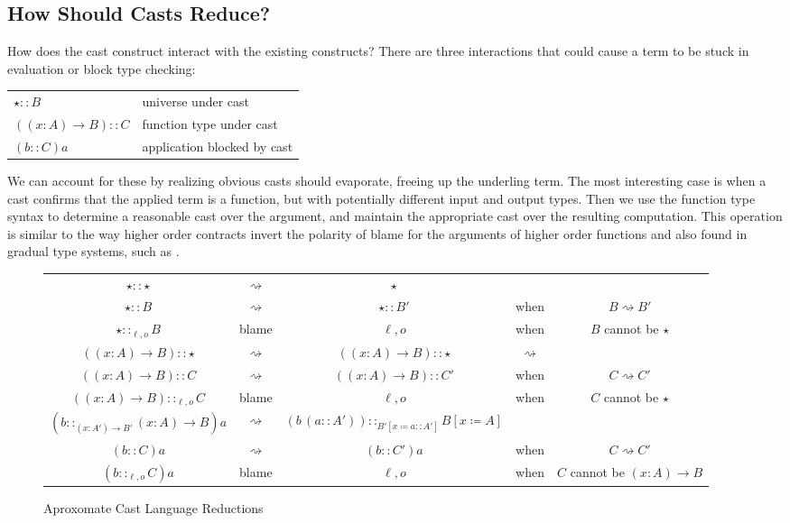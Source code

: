 \subsection{How Should Casts Reduce?}

How does the cast construct interact with the existing constructs?
There are three interactions that could cause a term to be stuck in evaluation or block type checking:

\begin{tabular}{ll}
$\star::B$ & universe under cast\tabularnewline
$\left(\left(x:A\right)\rightarrow B\right)::C$ & function type under cast\tabularnewline
$\left(b::C\right)a$ & application blocked by cast\tabularnewline
\end{tabular}

We can account for these by realizing obvious casts should evaporate, freeing up the underling term.
The most interesting case is when a cast confirms that the applied term is a function, but with potentially different input and output types.
Then we use the function type syntax to determine a reasonable cast over the argument, and maintain the appropriate cast over the resulting computation.
This operation is similar to the way higher order contracts invert the polarity of blame for the arguments of higher order functions \cite{10.1145/581478.581484} and also found in gradual type systems, such as \cite{10.1007/978-3-642-00590-9_1}.

\begin{sidewaysfigure}
\begin{tabular}{ccccc}
$\star::\star$ & $\rightsquigarrow$ & $\star$ &  & \tabularnewline
$\star::B$ & $\rightsquigarrow$ & $\star::B'$ & when  & $B\rightsquigarrow B'$\tabularnewline
$\star::_{\ell,o}B$ & blame & $\ell,o$ & when  & $B$ cannot be $\star$ \tabularnewline
$\left(\left(x:A\right)\rightarrow B\right)::\star$ & $\rightsquigarrow$ & $\left(\left(x:A\right)\rightarrow B\right)::\star$ & $\rightsquigarrow$ & \tabularnewline
$\left(\left(x:A\right)\rightarrow B\right)::C$ & $\rightsquigarrow$ & $\left(\left(x:A\right)\rightarrow B\right)::C'$ & when  & $C\rightsquigarrow C'$\tabularnewline
$\left(\left(x:A\right)\rightarrow B\right)::_{\ell,o}C$ & blame & $\ell,o$ & when  & $C$ cannot be $\star$ \tabularnewline
$\left(b::_{\left(x:A'\right)\rightarrow B'}\left(x:A\right)\rightarrow B\right)a$ & $\rightsquigarrow$ & $\left(b\,\left(a::A'\right)\right)::_{B'\left[x\coloneqq a::A'\right]}B\left[x\coloneqq A\right]$ &  & \tabularnewline
$\left(b::C\right)a$ & $\rightsquigarrow$ & $\left(b::C'\right)a$ & when  & $C\rightsquigarrow C'$\tabularnewline
$\left(b::_{\ell,o}C\right)a$ & blame & $\ell,o$ & when  & $C$ cannot be $\left(x:A\right)\rightarrow B$ \tabularnewline
\end{tabular}

\caption{Aproxomate Cast Language Reductions}
\label{fig:cast-aprox-red}
\end{sidewaysfigure}

